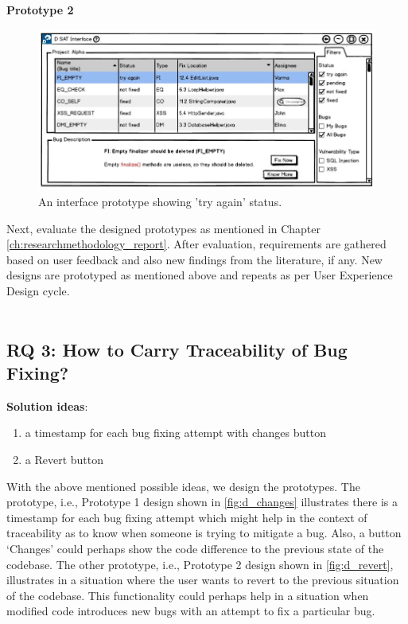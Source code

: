 \textbf{Prototype 2}

\begin{figure}[hbt!]
	\centering
	\includegraphics[width=\linewidth]{figures/d_tryagain}
	\caption{An interface prototype showing 'try again' status.}
	\label{fig:d_tryagain}
\end{figure}

\clearpage

Next, evaluate the designed prototypes as mentioned in Chapter \ref{ch:researchmethodology_report}. After evaluation, requirements are gathered based on user feedback and also new findings from the literature, if any. New designs are prototyped as mentioned above and repeats as per User Experience Design cycle. \\ \\

\subsection{RQ 3: How to Carry Traceability of Bug Fixing?}

\textbf{Solution ideas}: \\
\begin{enumerate}
\item  a timestamp for each bug fixing attempt with changes button
\item  a Revert button
\end{enumerate}

With the above mentioned possible ideas, we design the prototypes. The prototype, i.e., Prototype 1 design shown in \autoref{fig:d_changes} illustrates there is a timestamp for each bug fixing attempt which might help in the context of traceability as to know when someone is trying to mitigate a bug. Also, a button ‘Changes’ could perhaps show the code difference to the previous state of the codebase. The other prototype, i.e., Prototype 2 design shown in \autoref{fig:d_revert}, illustrates in a situation where the user wants to revert to the previous situation of the codebase. This functionality could perhaps help in a situation when modified code introduces new bugs with an attempt to fix a particular bug. \\ \\

